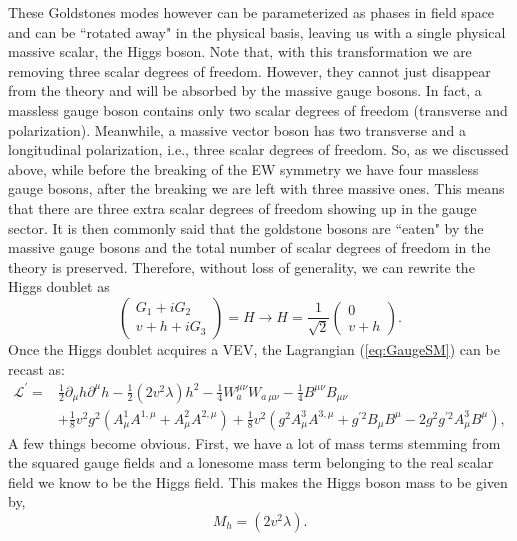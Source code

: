These Goldstones modes however can be parameterized as phases in field space and can be ``rotated away" in the physical basis, leaving us with a single physical massive scalar, the Higgs boson. Note that, with this transformation we are removing three scalar degrees of freedom.  However, they cannot just disappear from the theory and will be absorbed by the massive gauge bosons.
%
In fact, a massless gauge boson contains only two scalar degrees of freedom (transverse and polarization). Meanwhile, a massive vector boson has two transverse and a longitudinal polarization, i.e., three scalar degrees of freedom. So, as we discussed above, while before the breaking of the EW symmetry we have four massless gauge bosons, after the breaking we are left with three massive ones. This means that there are three extra scalar degrees of freedom showing up in the gauge sector. It is then commonly said that the goldstone bosons are ``eaten" by the massive gauge bosons and the total number of scalar degrees of freedom in the theory is preserved. Therefore, without loss of generality, we can rewrite the Higgs doublet as
%
\begin{equation}
 \begin{pmatrix}
G_1 + i G_2 \\ 
v + h + i G_3 
\end{pmatrix} = H  \rightarrow H =  \frac{1}{\sqrt{2}} \begin{pmatrix}
0 \\ 
v + h 
\end{pmatrix}  .
\label{shame}
\end{equation}
Once the Higgs doublet acquires a VEV, the Lagrangian (\ref{eq:GaugeSM}) can be recast as:
%
\begin{align}
\mathcal{L}^\prime = & \frac{1}{2} \partial_\mu h \partial^\mu h - \frac{1}{2} (2v^2 \lambda) h^2
 - \frac{1}{4}  W^{\mu \nu}_a W_{a \, \mu \nu}  
- \frac{1}{4}  B^{\mu \nu} B_{\mu \nu}  \nonumber \\
& + \frac{1}{8} v^2 g^2 (A^1_\mu A^{1,\mu}+ A^2_\mu A^{2,\mu}) +  \frac{1}{8} v^2  (g^2  A^3_\mu A^{3,\mu} + g^{\prime 2} B_\mu B^\mu - 2 g^2 g^{\prime 2} A^3_\mu B^\mu )  , 
\label{complicatedpart}
\end{align}
%
A few things become obvious. First, we have a lot of mass terms stemming from the squared gauge fields and a lonesome mass term belonging to the real scalar field we know to be the Higgs field. This makes the Higgs boson mass to be given by,
%
\begin{equation}
M_h= (2v^2 \lambda).  
\end{equation}
